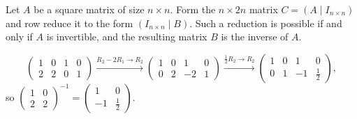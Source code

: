 \begin{fact}
Let $A$ be a square matrix of size $n\times n$. Form the $n\times 2n$ matrix $C=(A\mid I_{n\times n})$ and row reduce
it to the form $(I_{n\times n}\mid B)$. Such a reduction is possible if and only if $A$ is invertible, and
the resulting matrix $B$ is the inverse of $A$.
\end{fact}

\begin{example}
\[
\left ( \begin{array}{cc|cc}
1 & 0 & 1 & 0 \\ 2 & 2 & 0 & 1
\end{array} \right )
\xrightarrow{R_2-2R_1\to R_2}
\left ( \begin{array}{cc|cc}
1 & 0 & 1 & 0 \\ 0 & 2 & -2 & 1
\end{array} \right )
\xrightarrow{\frac{1}{2}R_2\to R_2}
\left ( \begin{array}{cc|cc}
1 & 0 & 1 & 0 \\ 0 & 1 & -1 & \tfrac{1}{2}
\end{array} \right ),
\]
so $\left ( \begin{smallmatrix} 1 & 0\\ 2 & 2 \end{smallmatrix} \right )^{-1}
= \left ( \begin{smallmatrix} 1 & 0\\ -1 & \tfrac{1}{2} \end{smallmatrix} \right )$.
\end{example}

